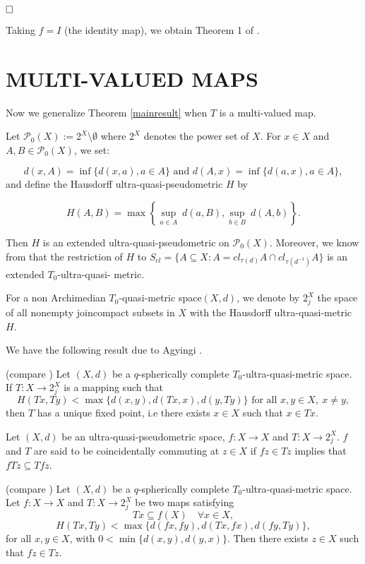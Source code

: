 \documentclass[10pt,a4paper]{article}
\begin{document}
{$\hfill{\Box}$

\corollary Taking $f=I$ (the identity map), we obtain Theorem 1 of \cite{Agyingifixed}.





\section{\textsc{MULTI-VALUED MAPS}}

Now we generalize Theorem \ref{mainresult} when $T$ is a multi-valued map. 

Let $\mathcal{P}_0(X):=2^X \setminus \emptyset$ where $2^X$ denotes the power set of $X$. For $x\in X$ and $A,B \in \mathcal{P}_0(X)$, we set:

$$ d(x,A)= \inf\{ d(x,a),a\in A\}  \text{ and }  d(A,x)= \inf\{ d(a,x),a\in A\},$$
and define the Hausdorff ultra-quasi-pseudometric  $H$ by 

$$H(A,B)= \max \left\lbrace \underset{a\in A}{\sup}\ d(a,B), \underset{b\in B}{\sup} \ d(A,b)   \right\rbrace.$$

Then $H$ is an extended ultra-quasi-pseudometric on $\mathcal{P}_0(X)$. Moreover, we know from \cite{Kunzi} that the restriction of $H$ to $S_{cl}= \{A\subseteq X: A= cl_{\tau (d)}A \cap cl_{\tau (d^{-1})}A  \}$ is an extended $T_0$-ultra-quasi- metric.

For a non Archimedian $T_0$-quasi-metric space$(X,d)$, we denote by $2^X_j$ the space of all nonempty joincompact subsets in $X$ with the Hausdorff ultra-quasi-metric $H$.

We have the following result due to Agyingi \cite{Agyingifixed}.

\theorem (compare \cite{Agyingifixed}) Let $(X,d)$ be a $q$-spherically complete $T_0$-ultra-quasi-metric space. If $T:X\to 2^X_j$ is a mapping such that 
\[ H(Tx,Ty)< \max\{ d(x,y),d(Tx,x),d(y,Ty)\} \text{ for all }x,y\in X,\ x\neq y,\]
then $T$ has a unique fixed point, i.e there exists $x\in X$ such that $x\in Tx$.

 Let $(X,d)$ be an ultra-quasi-pseudometric space, $f:X\to X$ and $T:X\to  2^X_j $. $f$ and $T$ are said to be coincidentally commuting at $z\in X$ if $fz \in Tz $ implies that $fTz\subseteq Tfz$.

\theorem\label{multivalued} (compare \cite[Theorem 9]{Rao}) Let $(X,d)$ be a $q$-spherically complete $T_0$-ultra-quasi-metric space. Let $f:X\to X$ and $T:X\to  2^X_j $ be two maps satisfying 
\begin{equation}\label{6}
Tx\subseteq f(X) \quad \forall x\in X,
\end{equation}
\begin{equation}\label{7}
H(Tx,Ty)< \max\{ d(fx,fy),d(Tx,fx),d(fy,Ty)\},
\end{equation}
for all $x,y\in X$, with $0<\min\{d(x,y),d(y,x)\}$. Then there exists $z\in X$ such that $fz \in Tz$. 

}
\end{document}
